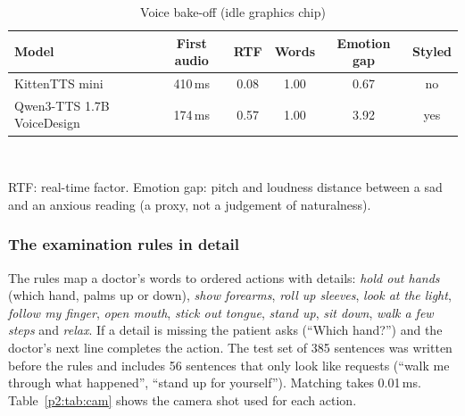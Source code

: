 \documentclass[journal]{IEEEtran}
\begin{document}
\begin{table}[t]
\caption{Voice bake-off (idle graphics chip)}
\label{p2:tab:tts}
\centering
\scriptsize
\setlength{\tabcolsep}{3pt}
\begin{tabular}{@{}lccccc@{}}
\toprule
Model & First audio & RTF & Words & Emotion gap & Styled\\
\midrule
KittenTTS mini & 410\,ms & 0.08 & 1.00 & 0.67 & no\\
Qwen3-TTS 1.7B VoiceDesign & 174\,ms & 0.57 & 1.00 & 3.92 & yes\\
\bottomrule
\end{tabular}
\\[1mm]\raggedright\scriptsize RTF: real-time factor. Emotion gap: pitch and loudness distance between a sad and an anxious reading (a proxy, not a
judgement of naturalness).
\end{table}

\subsubsection{The examination rules in detail}
The rules map a doctor's words to ordered actions with details: \emph{hold out hands} (which hand, palms up or down), \emph{show forearms},
\emph{roll up sleeves}, \emph{look at the light}, \emph{follow my finger}, \emph{open mouth}, \emph{stick out tongue}, \emph{stand up},
\emph{sit down}, \emph{walk a few steps} and \emph{relax}. If a detail is missing the patient asks (``Which hand?'') and the doctor's next line
completes the action. The test set of 385 sentences was written before the rules and includes 56 sentences that only look like requests (``walk
me through what happened'', ``stand up for yourself''). Matching takes 0.01\,ms. Table~\ref{p2:tab:cam} shows the camera shot used for each action.
\end{document}
